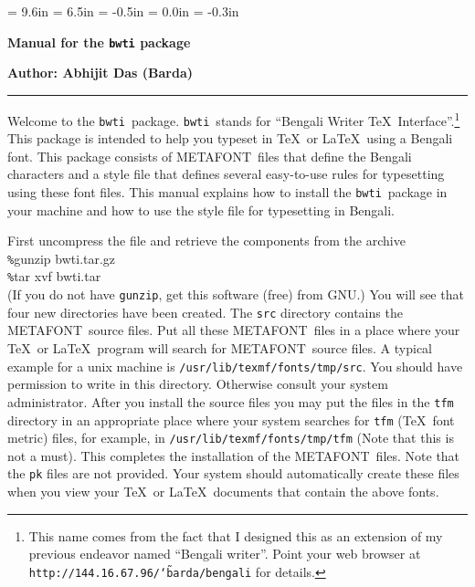 \textheight = 9.6in
\textwidth = 6.5in
\topmargin = -0.5in
\oddsidemargin = 0.0in
\evensidemargin = -0.3in
\parskip 0.1in
\pagestyle{myheadings}
\raggedbottom



\def\bwti{{\tt bwti}}
\def\METAFONT{{\sf METAFONT}}
\def\newsect#1{\bigskip\pagebreak[2]\par\noindent{\LARGE\sf #1}\hfill\nopagebreak\medskip\nopagebreak\break\nopagebreak}
\def\bs{\char`\\}


\thispagestyle{plain}
\centerline{\huge \bf Manual for the {\LARGE\tt bwti} package}\medskip
\centerline{\LARGE \bf Author: \sc Abhijit Das (Barda)}\bigskip
\hrule\bigskip

\noindent
Welcome to the \bwti\ package. \bwti\ stands for ``Bengali Writer
\TeX\ Interface''.\footnote{This name comes from the fact that
I designed this as an extension of my previous endeavor named
``Bengali writer''. Point your web browser at
{\tt http://144.16.67.96/\char`\~barda/bengali} for details.}
This package is intended to help you typeset
in \TeX\ or \LaTeX\ using a Bengali font. This package consists of
\METAFONT\ files that define the Bengali characters and a style
file that defines several easy-to-use rules for typesetting using
these font files. This manual explains how to install the
\bwti\ package in your machine and how to use the style file for
typesetting in Bengali.

\newsect{How to install \bwti}
First uncompress the file and retrieve the components from the archive\\
{\tt \%}gunzip bwti.tar.gz\\
{\tt \%}tar xvf bwti.tar\\
(If you do not have {\tt gunzip}, get this software (free) from GNU.)
You will see that four new directories have been created. The
{\tt src} directory contains the \METAFONT\ source files. Put all these
\METAFONT\ files in a place where your \TeX\ or \LaTeX\ program will search for
\METAFONT\ source files. A typical example for a unix machine is
{\tt /usr/lib/texmf/fonts/tmp/src}. You should have permission to write in this
directory. Otherwise consult your system administrator. After you install
the source files you may put the files in the {\tt tfm} directory
in an appropriate place where your system searches for {\tt tfm} (\TeX\ font
metric) files,
for example, in {\tt /usr/lib/texmf/fonts/tmp/tfm} (Note that this is not
a must). This completes the installation
of the \METAFONT\ files.
Note that the {\tt pk} files are not provided. Your system should automatically create
these files when you view your \TeX\ or \LaTeX\ documents that contain the above
fonts.

